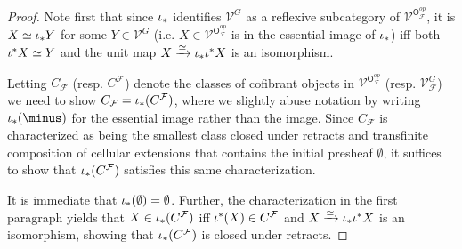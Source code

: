 \documentclass[a4paper,10pt
,draft
]{article}%
\numberwithin{equation}{section}
\numberwithin{figure}{section}
\theoremstyle{definition} %
\newcommand{\1}{\ensuremath{\mathbbm 1}}%
\begin{document}
\begin{proof}
        Note first that since $\iota_{\**}$ identifies 
        $\mathcal{V}^{G}$ as a reflexive 
        subcategory of $\mathcal{V}^{\mathsf{O}_{\mathcal{F}}^{op}}$, 
        it is 
        $X \simeq \iota_{\**}Y$ for some 
        $Y \in \mathcal{V}^{G}$
        (i.e. $X \in \mathcal{V}^{\mathsf{O}_{\mathcal{F}}^{op}}$
        is in the essential image of $\iota_{\**}$)
        iff both $\iota^{\**}X \simeq Y$ and the unit map 
        $X \xrightarrow{\simeq} \iota_{\**} \iota^{\**}X$
        is an isomorphism.

        Letting $C_{\mathcal{F}}$ (resp. $C^{\mathcal{F}}$) denote the classes of cofibrant objects in 
        $\mathcal{V}^{\mathsf{O}_{\mathcal{F}}^{op}}$ 
        (resp. $\mathcal{V}^G_{\mathcal{F}}$)
        we need to show 
        $C_{\mathcal{F}} = \iota_{\**}(C^{\mathcal{F}})$,
        where we slightly abuse notation by writing 
        $\iota_{\**}(\minus)$ for the essential image rather than the image.
        Since $C_{\mathcal{F}}$ is characterized as being the smallest class closed under retracts and transfinite composition of cellular extensions
        that contains the initial presheaf $\emptyset$,
        it suffices to show that 
        $\iota_{\**}(C^{\mathcal{F}})$
        satisfies this same characterization.

        It is immediate that $\iota_{\**}(\emptyset) = \emptyset$.
        Further, the characterization in the first paragraph yields that 
        $X \in \iota_{\**}(C^{\mathcal{F}})$ iff $\iota^{\**}(X)\in C^{\mathcal{F}}$ and $X \xrightarrow{\simeq} \iota_{\**} \iota^{\**}X$ is an isomorphism, showing that  
        $\iota_{\**}(C^{\mathcal{F}})$ is closed under retracts.


\end{proof}
\end{document}
